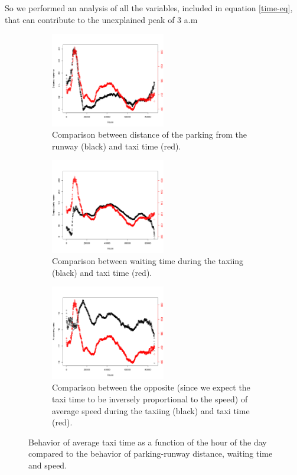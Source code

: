 \documentclass{article}
\begin{document}
So we performed an analysis of all the variables, included in equation \ref{time-eq}, that can contribute to the unexplained peak of 3 a.m

\begin{figure}[h!!!!!!!!!]
	\centering
	\begin{subfigure}[b]{0.5\textwidth}
		\centering
		\includegraphics[width=5cm]{Distance}
		\caption{Comparison between distance of the parking from the runway (black) and taxi time (red).}
		\label{distance}
	\end{subfigure}
	\hfil
	\begin{subfigure}[b]{0.4\textwidth}
		\centering
		\includegraphics[width=5cm]{TempsAttente}
		\caption{Comparison between waiting time during the taxiing (black) and taxi time (red).}
		\label{waiting}
	\end{subfigure}
	\begin{subfigure}[b]{0.7\textwidth}
		\centering
		\includegraphics[width=5cm]{Vitesse}
		\caption{Comparison between the opposite (since we expect the taxi time to be inversely proportional to the speed) of average speed during the taxiing (black) and taxi time (red).}
		\label{vitesse}
	\end{subfigure}
	\caption{Behavior of average taxi time as a function of the hour of the day compared to the behavior of parking-runway distance, waiting time and speed.}
	\label{comparisons}
\end{figure}
\end{document}
